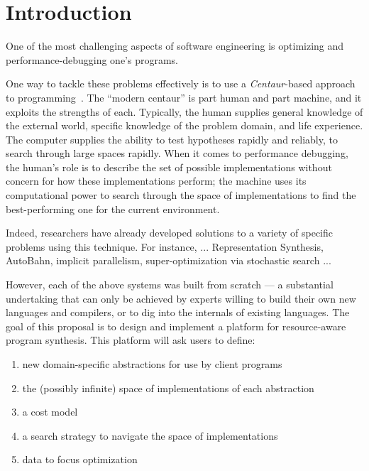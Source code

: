 
\section{Introduction}

One of the most challenging aspects of software engineering is
optimizing and performance-debugging one's programs.  

One way to tackle these problems effectively is to use a \emph{Centaur}-based 
approach to programming~\cite{centaur}.  The ``modern centaur'' is 
part human and part machine, and it exploits the strengths of each.
Typically, the human supplies general knowledge of the external world,
specific knowledge of the problem domain, and life experience.  The
computer supplies the ability to test hypotheses rapidly and reliably,
to search through large spaces rapidly.
When it comes to performance debugging, the human's role is to describe
the set of possible implementations without concern for how these implementations
perform; the machine uses its computational power to search through the space of 
implementations to find the best-performing one for the current environment.

Indeed, researchers have already developed solutions to a variety of specific problems
using this technique.  For instance, ... Representation Synthesis, AutoBahn, implicit
parallelism, super-optimization via stochastic search ...

However, each of the above systems was built from scratch --- a substantial undertaking
that can only be achieved by experts willing to build their own new languages and
compilers, or to dig into the internals of existing languages.  The goal of
this proposal is to design and implement a platform for resource-aware program
synthesis.  This platform will ask users to define:

\begin{enumerate}
\item new domain-specific abstractions for use by client programs
\item the (possibly infinite) space of implementations of each abstraction
\item a cost model
\item a search strategy to navigate the space of implementations
\item data to focus optimization
\end{enumerate}

